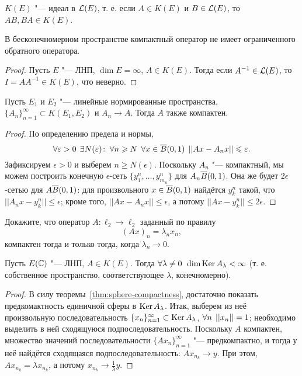 \documentclass[main]{subfiles}
\begin{document}
\begin{exercise}
  \( K(E) \) "--- идеал в \( \Linears{E} \),
  т. е. если \( A \in K(E) \) и \( B \in \Linears{E} \),
  то \( AB, BA \in K(E) \).
\end{exercise}

\begin{corollary}
  В бесконечномерном пространстве компактный оператор
  не имеет ограниченного обратного оператора.
\end{corollary}
\begin{proof}
  Пусть \( E \) "--- ЛНП, \( \dim E = \infty \), \( A \in K(E) \).
  Тогда если \( A^{-1} \in \Linears{E} \), то
  \( I = A A^{-1} \in K(E) \), что неверно.
\end{proof}

\begin{theorem}
  Пусть \( E_1 \) и \( E_2 \) "---
  линейные нормированные пространства,
  \( \{ A_n \}_{n=1}^\infty \subset K(E_1, E_2) \)
  и \( A_n \to A \).
  Тогда \( A \) также компактен.
\end{theorem}
\begin{proof}
  По определению предела и нормы,
  \[
    \forall {\varepsilon> 0} \; \, \exists N(\varepsilon) \colon \:
    \forall {n \geqslant N} \; \,
    \forall {x \in \overline{B}(0, 1)} \; \,
    ||A x - A_n x|| \leqslant \varepsilon.
  \]
  Зафиксируем \( \epsilon > 0 \)
  и выберем \( n \ge N(\epsilon) \).
  Поскольку \( A_n \) "--- компактный,
  мы можем построить конечную \( \epsilon \)-сеть
  \( \{ y^n_1, \dots, y^n_{m_n} \} \)
  для \( A_n \overline{B}(0, 1) \).
  Она же будет \( 2\epsilon \)-сетью для
  \( A \overline{B}(0, 1) \):
  для произвольного \( x \in \overline{B}(0, 1) \)
  найдётся \( y^n_k \) такой,
  что \( ||A_n x - y^n_k|| \le \epsilon \);
  кроме того, \( ||A x - A_n x|| \le \epsilon \),
  а потому \( ||A x - y^n_k|| \le 2\epsilon \).
\end{proof}

\begin{exercise}
  Докажите, что оператор
  \( A : \ell_2 \to \ell_2 \) заданный
  по правилу
  \[
    (A x)_n = \lambda_n x_n,
  \]
  компактен тогда и только тогда,
  когда \( \lambda_n \to 0 \).
\end{exercise}

\begin{theorem}
  Пусть \( E(\mathbb{C}) \) "--- ЛНП,
  \( A \in K(E) \).
  Тогда \( \forall {\lambda \ne 0} \; \, \dim \operatorname{Ker} A_\lambda < \infty \)
  (т. е. собственное пространство,
  соответствующее \( \lambda \),
  конечномерно).
\end{theorem}
\begin{proof}
  В силу теоремы~\ref{thm:sphere-compactness},
  достаточно показать предкомактность
  единичной сферы в \( \operatorname{Ker} A_\lambda \).
  Итак, выберем из неё
  произвольную последовательность
  \( \{ x_n \}_{n=1}^\infty \subset \operatorname{Ker} A_\lambda \),
  \( \forall {n} \; \, ||x_n|| = 1 \);
  необходимо выделить в ней
  сходящуюся подпоследовательность.
  Поскольку \( A \) компактен,
  множество значений последовательности
  \( \{ A x_n \}_{n=1}^\infty \) "--- предкомпактно,
  и тогда у неё найдётся сходящаяся подпоследовательность:
  \( A x_{n_k} \to y \).
  При этом, \( A x_{n_k} = \lambda x_{n_k} \),
  а потому
  \( x_{n_k} \to \frac{1}\lambda y \).
\end{proof}
\end{document}
